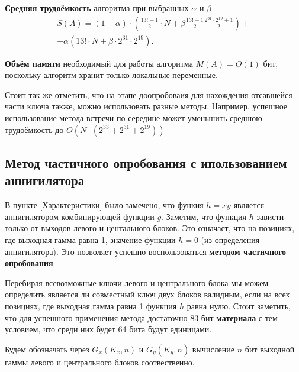 \documentclass[a4paper,12pt]{article}
\theoremstyle{definition}
\begin{document}
	\textbf{Средняя трудоёмкость} алгоритма при выбранных $\alpha$ и $\beta$ 
	\begin{multline*}	
	S(A)=\left( 1-\alpha \right)\cdot \left( \frac{13! + 1}{2} \cdot N + \beta \frac{13! + 1}{2} \frac{2^{31} \cdot 2^{19} + 1}{2} \right) + \\ + \alpha \left( 13! \cdot N + \beta \cdot 2^{31} \cdot 2^{19}  \right).
	\end{multline*}		

	\textbf{Объём памяти} необходимый для работы алгоритма $M(A) = O(1)$ бит, поскольку алгоритм хранит только локальные переменные.
	
	Стоит так же отметить, что на этапе доопробоваия для нахождения отсавшейся части ключа также, можно использовать разные методы. Например, успешное использование метода встречи по середине может уменьшить среднюю трудоёмкость до $O\left(N\cdot\left( 2^{33} + 2^{31} + 2^{19} \right) \right)$
	
	\subsection{Метод частичного опробования с ипользованием аннигилятора}
	
	В пункте \ref{Характеристики} было замечено, что функия $h=x y$ является аннигилятором комбинирующей функции $g$. Заметим, что функция $h$ зависти только от выходов левого и центального блоков. Это означает, что на позициях, где выходная гамма равна 1, значение функции $h=0$ (из определения аннигилятора). Это позволяет успешно воспользоваться \textbf{методом частичного опробования}.
	
	Перебирая всевозможные ключи левого и центрального блока мы можем определить является ли совместный ключ двух блоков валидным, если на всех позициях, где выходная гамма равна 1 функция $h$ равна нулю. Стоит заметить, что для успешного применения метода достаточно 83 бит \textbf{материала} с тем условием, что среди них будет 64 бита будут единицами.
	
	Будем обозначать через $G_x(K_x, n)$ и $G_y(K_y, n)$ вычисление $n$ бит выходной гаммы левого и центрального блоков соотвественно.
	
\end{document}
